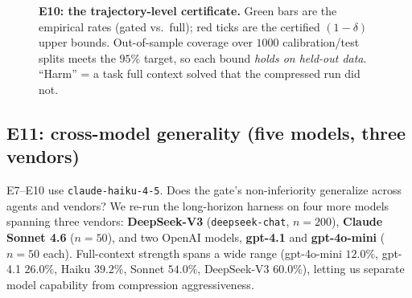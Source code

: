 \documentclass[11pt]{article}
\begin{document}
\begin{figure}[t]
\centering
{}
\caption{\textbf{E10: the trajectory-level certificate.} \textcolor{distilgreen}{Green bars}
are the empirical rates (gated vs.\ full); \textcolor{distilred}{red ticks} are the certified
$(1{-}\delta)$ upper bounds. Out-of-sample coverage over $1000$ calibration/test splits meets
the $95\%$ target, so each bound \emph{holds on held-out data}. ``Harm'' = a task full context
solved that the compressed run did not.}
\label{fig:e10cert}
\end{figure}

\subsection{E11: cross-model generality (five models, three vendors)}
\label{sec:e11}

E7--E10 use \texttt{claude-haiku-4-5}. Does the gate's non-inferiority generalize across agents
and vendors? We re-run the long-horizon harness on four more models spanning three vendors:
\textbf{DeepSeek-V3} (\texttt{deepseek-chat}, $n{=}200$), \textbf{Claude Sonnet 4.6}
($n{=}50$), and two OpenAI models, \textbf{gpt-4.1} and \textbf{gpt-4o-mini} ($n{=}50$ each).
Full-context strength spans a wide range (gpt-4o-mini $12.0\%$, gpt-4.1 $26.0\%$, Haiku
$39.2\%$, Sonnet $54.0\%$, DeepSeek-V3 $60.0\%$), letting us separate model capability from
compression aggressiveness.
\end{document}

